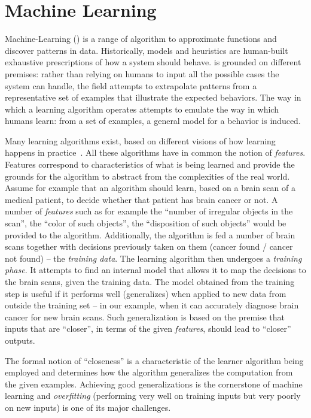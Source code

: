 \section{Machine Learning}

Machine-Learning (\ML) \cite{mitchell:1997} is a range of algorithm to
approximate functions and discover patterns in data.
Historically, models and heuristics are human-built exhaustive prescriptions of
how a system should behave. \ML is grounded on different premises:
rather than relying on humans to input all the possible cases the system can
handle, the field attempts to extrapolate patterns from a representative
set of examples that illustrate the expected behaviors. The way in which a
learning algorithm operates attempts to emulate the way in which humans learn:
from a set of examples, a general model for a behavior is induced.

Many learning algorithms exist, based on different visions of how learning
happens in practice~\cite{Domingos:2015}. All these algorithms have in common
the notion of \emph{features}. Features correspond to characteristics of what is
being learned and provide the grounds for the algorithm to abstract from the
complexities of the real world. Assume for example that an algorithm should
learn, based on a brain scan of a medical patient, to decide whether that
patient has brain cancer or not. A number of \emph{features} such as for example
the ``number of irregular objects in the scan'', the ``color of such objects'',
the ``disposition of such objects'' would be provided to the algorithm.
Additionally, the algorithm is fed a number of brain scans together with
decisions previously taken on them (cancer found / cancer not found) -- the
\emph{training data}.
The learning algorithm then undergoes a \emph{training phase}. It attempts to
find an internal model that allows it to map the decisions to the brain scans,
given the training data. The model obtained from the training step is useful if
it performs well (generalizes) when applied to new data from outside the training
set -- in our example, when it can accurately diagnose brain cancer for new
brain scans. Such generalization is based on the premise that inputs that are
``closer'', in terms of the given \emph{features}, should lead to ``closer''
outputs.

The formal notion of ``closeness'' is a characteristic of the learner
algorithm being employed and determines how the algorithm generalizes the computation from
the given examples. Achieving good generalizations is the cornerstone of
machine learning and \emph{overfitting} (performing very well on training
inputs but very poorly on new inputs) is one of its major challenges.

